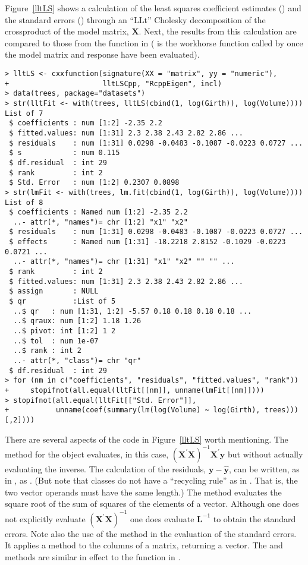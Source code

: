 \documentclass[shortnames,article]{jss}
\begin{document}
Figure~\ref{lltLS} shows a calculation of the least squares coefficient estimates
() and the standard errors () through an
``LLt'' Cholesky decomposition of the crossproduct of the model
matrix, $\bm X$.  Next, the results from this calculation are compared
to those from the  function in 
( is the workhorse function called by  once the
model matrix and response have been evaluated).
\begin{verbatim}
> lltLS <- cxxfunction(signature(XX = "matrix", yy = "numeric"), 
+                      lltLSCpp, "RcppEigen", incl)
> data(trees, package="datasets")
> str(lltFit <- with(trees, lltLS(cbind(1, log(Girth)), log(Volume))))
List of 7
 $ coefficients : num [1:2] -2.35 2.2
 $ fitted.values: num [1:31] 2.3 2.38 2.43 2.82 2.86 ...
 $ residuals    : num [1:31] 0.0298 -0.0483 -0.1087 -0.0223 0.0727 ...
 $ s            : num 0.115
 $ df.residual  : int 29
 $ rank         : int 2
 $ Std. Error   : num [1:2] 0.2307 0.0898
> str(lmFit <- with(trees, lm.fit(cbind(1, log(Girth)), log(Volume))))
List of 8
 $ coefficients : Named num [1:2] -2.35 2.2
  ..- attr(*, "names")= chr [1:2] "x1" "x2"
 $ residuals    : num [1:31] 0.0298 -0.0483 -0.1087 -0.0223 0.0727 ...
 $ effects      : Named num [1:31] -18.2218 2.8152 -0.1029 -0.0223 0.0721 ...
  ..- attr(*, "names")= chr [1:31] "x1" "x2" "" "" ...
 $ rank         : int 2
 $ fitted.values: num [1:31] 2.3 2.38 2.43 2.82 2.86 ...
 $ assign       : NULL
 $ qr           :List of 5
  ..$ qr   : num [1:31, 1:2] -5.57 0.18 0.18 0.18 0.18 ...
  ..$ qraux: num [1:2] 1.18 1.26
  ..$ pivot: int [1:2] 1 2
  ..$ tol  : num 1e-07
  ..$ rank : int 2
  ..- attr(*, "class")= chr "qr"
 $ df.residual  : int 29
> for (nm in c("coefficients", "residuals", "fitted.values", "rank"))
+     stopifnot(all.equal(lltFit[[nm]], unname(lmFit[[nm]])))
> stopifnot(all.equal(lltFit[["Std. Error"]],
+           unname(coef(summary(lm(log(Volume) ~ log(Girth), trees)))[,2])))
\end{verbatim}


There are several aspects of the  code in
Figure~\ref{lltLS} worth mentioning.  The  method for the
 object evaluates, in this case, $\left(\bm X^\prime\bm
  X\right)^{-1}\bm X^\prime\bm y$ but without actually evaluating the
inverse.  The calculation of the residuals, $\bm y-\widehat{\bm y}$,
can be written, as in , as . (But note
that  classes do not have a ``recycling rule'' as in
.  That is, the two vector operands must have the same
length.)  The  method evaluates the square root of the
sum of squares of the elements of a vector.  Although one does not
explicitly evaluate $\left(\bm X^\prime\bm X\right)^{-1}$ one does
evaluate $\bm L^{-1}$ to obtain the standard errors.  Note also the
use of the  method in the evaluation of the standard
errors.  It applies a method to the columns of a matrix, returning a
vector.  The   and  methods
are similar in effect to the  function in .
\end{document}
